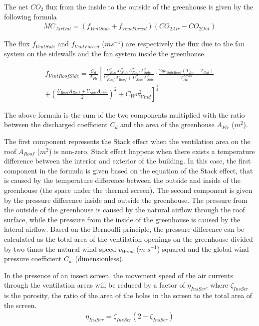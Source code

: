 \documentclass[a4paper]{article}
\begin{document}
The net \(CO_2\) flux from the inside to the outside of the greenhouse is given by the following formula
\begin{align}
  MC_{AirOut} = (f_{VentSide} + f_{VentForced})(CO_{2 Air} - CO_{2 Out})
\end{align}

The flux \(f_{VentSide}\) and \(f_{VentForced}\) (\(m s^{-1}\)) are respectively the flux due to the fan system on the sidewalls and the fan system inside the greenhouse.


\begin{multline}
  \label{eq:vent_roof_side}
  f_{VentRoofSide} = \frac{C_d}{A_{Flr}} \left[\frac{U_{Roof}^2 U_{Side}^2 A_{Roof}^2 A_{Side}^2}{U_{Roof}^2 A_{Roof}^2 + U_{Side}^2 A_{Side}^2} \cdot \frac{2gh_{SideRoof} (T_{Air} - T_{Out})}{T_{Air}^{Mean}}\right. \\
  + \left.{ \left(\frac{U_{Roof} A_{Roof} + U_{Side} A_{Side}}{2}\right)}^2 + C_W v_{Wind}^2\right]^{\frac{1}{2}}
\end{multline}

The above formula is the sum of the two components multiplied with the ratio between the discharged coefficient \(C_d\) and the area of the greenhouse \(A_{Flr}\) (\(m^2\)).

The first component represents the Stack effect when the ventilation area on the roof \(A_{Roof}\) (\(m^2\)) is non-zero. Stack effect happens when there exists a temperature difference between the interior and exterior of the building. In this case, the first component in the formula is given based on the equation of the Stack effect, that is caused by the temperature difference between the outside and inside of the greenhouse (the space under the thermal screen).
The second component is given by the pressure difference inside and outside the greenhouse. The pressure from the outside of the greenhouse is caused by the natural airflow through the roof surface, while the pressure from the inside of the greenhouse is caused by the lateral airflow. Based on the Bernoulli principle, the pressure difference can be calculated as the total area of the ventilation openings on the greenhouse divided by two times the natural wind speed \(v_{Wind}\) (\(m\;s^{-1}\)) squared and the global wind pressure coefficient \(C_w\) (dimensionless).

In the presence of an insect screen, the movement speed of the air currents through the ventilation areas will be reduced by a factor of \(\eta_{InsScr}\), where \(\zeta_{InsScr}\) is the porosity, the ratio of the area of the holes in the screen to the total area of the screen.
\begin{align}
  \eta_{InsScr} = \zeta_{InsScr} (2 -  \zeta_{InsScr})
\end{align}
\end{document}

